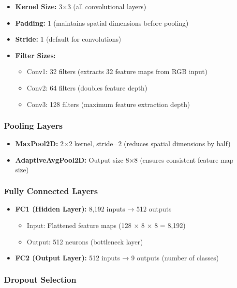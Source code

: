 \documentclass[12pt,a4paper]{article}
\begin{document}
\begin{itemize}
    \item \textbf{Kernel Size:} 3×3 (all convolutional layers)
    \item \textbf{Padding:} 1 (maintains spatial dimensions before pooling)
    \item \textbf{Stride:} 1 (default for convolutions)
    \item \textbf{Filter Sizes:}
    \begin{itemize}
        \item Conv1: 32 filters (extracts 32 feature maps from RGB input)
        \item Conv2: 64 filters (doubles feature depth)
        \item Conv3: 128 filters (maximum feature extraction depth)
    \end{itemize}
\end{itemize}

\subsubsection{Pooling Layers}

\begin{itemize}
    \item \textbf{MaxPool2D:} 2×2 kernel, stride=2 (reduces spatial dimensions by half)
    \item \textbf{AdaptiveAvgPool2D:} Output size 8×8 (ensures consistent feature map size)
\end{itemize}

\subsubsection{Fully Connected Layers}

\begin{itemize}
    \item \textbf{FC1 (Hidden Layer):} 8,192 inputs → 512 outputs
    \begin{itemize}
        \item Input: Flattened feature maps (128 × 8 × 8 = 8,192)
        \item Output: 512 neurons (bottleneck layer)
    \end{itemize}
    \item \textbf{FC2 (Output Layer):} 512 inputs → 9 outputs (number of classes)
\end{itemize}

\subsubsection{Dropout Selection}
\end{document}

